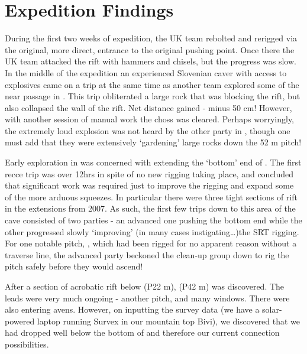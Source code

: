 \section{Expedition Findings}


During the first two weeks of expedition, the UK team rebolted and
rerigged  via the original, more direct, entrance to the
original pushing point. Once there the UK team attacked the rift with
hammers and chisels, but the progress was slow. In the middle of the
expedition an experienced Slovenian caver with access to explosives came
on a trip at the same time as another team explored some of the near
passage in . This trip obliterated a large rock that was
blocking the rift, but also collapsed the wall of the rift. Net distance
gained - minus 50 cm! However, with another session of manual work the
choss was cleared. Perhaps worryingly, the extremely loud explosion was
not heard by the other party in , though one must add
that they were extensively `gardening' large rocks down the 52 m
 pitch!


Early exploration in  was concerned with extending the
`bottom' end of . The first recce trip was over
12hrs in spite of no new rigging taking place, and concluded that
significant work was required just to improve the rigging and expand
some of the more arduous squeezes. In particular there were three tight
sections of rift in the  extensions from 2007. As such,
the first few trips down to this area of the cave consisted of two
parties - an advanced one pushing the bottom end while the other
progressed slowly `improving' (in many cases instigating\ldots{})the
SRT rigging. For one notable pitch, , which had
been rigged for no apparent reason without a traverse line, the advanced
party beckoned the clean-up group down to rig the pitch safely before
they would ascend!

After a section of acrobatic rift below  (P22 m),
 (P42 m) was discovered. The leads were very much
ongoing - another pitch, and many windows. There were also entering
avens. However, on inputting the survey data (we have a solar-powered
laptop running Survex in our mountain top Bivi), we discovered that we
had dropped well below the bottom of  and therefore our current
connection possibilities.


